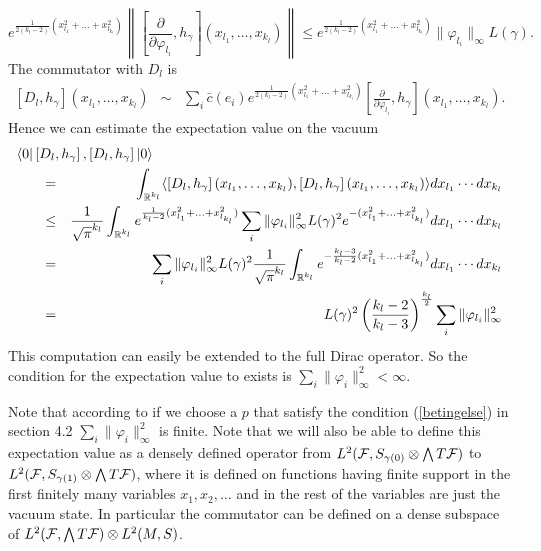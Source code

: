 \documentclass[letterpaper,12pt]{article}
\newcommand{\nn}{\nonumber}
\def\cf{{\cal F}}
\newcommand{\cF}{{\cal F}}
\newcommand{\R}{\mathbb{ R}}
\begin{document}
$$ e^{\frac{1}{2(k_l-2)}(x_{l_1}^2+\ldots +x_{l_{k_l}}^2)} \left\| \left[ \frac{\partial}{ \partial \varphi_{l_i}} , h_\gamma \right]  (x_{l_1}, \ldots , x_{k_{l}}) \right\|  \leq e^{\frac{1}{2(k_l-2)}(x_{l_1}^2+\ldots +x_{l_{k_l}}^2)} \| \varphi_{l_i}\|_\infty L(\gamma )  . $$ 
The commutator with $D_l$ is
\begin{eqnarray*} 
\left[ D_l , h_\gamma \right] ( x_{l_1}, \ldots , x_{k_{l}} ) &\sim & \sum_i \bar{c} (e_i) 
e^{\frac{1}{2(k_l-2)}(x_{l_1}^2+\ldots +x_{l_{k_l}}^2)}  \left[ \frac{\partial}{ \partial \varphi_{l_i}} , h_\gamma \right] (x_{l_1}, \ldots , x_{k_{l}}) . 
\end{eqnarray*}
 Hence we can estimate the expectation value on the vacuum
\begin{eqnarray*}
\langle 0| \left[ D_l , h_\gamma \right] ,\left[ D_l , h_\gamma \right] |0     \rangle  \hspace{-2,8cm}&&
\nn\\
&=& \int_{\R^{k_l}} \langle \left[ D_l , h_\gamma \right] ( x_{l_1}, \ldots , x_{k_{l}} )   , \left[ D_l , h_\gamma \right] ( x_{l_1}, \ldots , x_{k_{l}} ) \rangle  dx_{l_1} \cdots dx_{k_l} \\
&\leq &\frac{1}{\sqrt{\pi}^{k_l}} \int_{\R^{k_l}}  e^{\frac{1}{k_l-2}(x_{l_1}^2+\ldots +x_{l_{k_l}}^2)} \sum_i \| \varphi_{l_i}\|_\infty^2 L(\gamma)^2  e^{-(x_{l_1}^2+\ldots +x_{l_{k_l}}^2)}  dx_{l_1} \cdots dx_{k_l}\\
&=&  \sum_i \| \varphi_{l_i}\|_\infty^2 L(\gamma)^2 \frac{1}{\sqrt{\pi}^{k_l}}  \int_{\R^{k_l}}   e^{-\frac{k_l-3}{k_l-2}(x_{l_1}^2+\ldots +x_{l_{k_l}}^2)}  dx_{l_1} \cdots dx_{k_l}\\  
&=& L(\gamma)^2 \left( \frac{k_l-2}{k_l-3}\right)^{\frac{k_l}{2}} \sum_i \| \varphi_{l_i}\|_\infty^2   
\end{eqnarray*}
This computation can easily be extended to the full Dirac operator. So the condition for the expectation value to exists is $\sum_i \| \varphi_{i}\|_\infty^2<\infty$. 


Note that according to \cite{Aastrup:2017vrm} if we choose a $p$ that satisfy the condition (\ref{betingelse}) in section 4.2   $\sum_i \| \varphi_{i}\|_\infty^2$ is finite. Note that we will also be able to define this expectation value as a densely defined operator from  $L^2(\cF,S_{\gamma (0)} \otimes \bigwedge T\cf )$ to $L^2(\cF,S_{\gamma (1)} \otimes \bigwedge T\cf )$, where it is defined on functions having finite support in the first finitely many variables $x_1,x_2,\ldots$ and in the rest of the variables are just the vacuum state. In particular the commutator can be defined on a dense subspace of $L^2(\cF,  \bigwedge T\cf ) \otimes L^2(M,S)$.  
\end{document}
